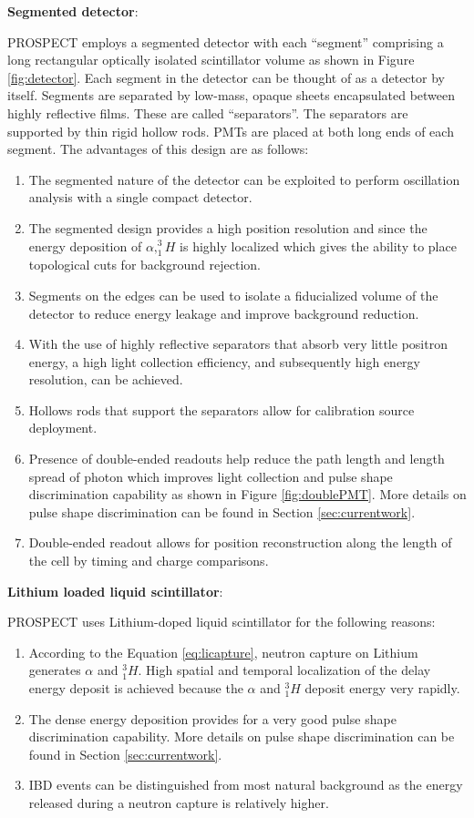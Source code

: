 \documentclass[11pt]{article}
\numberwithin{equation}{section}
\begin{document}
\noindent
\textbf{Segmented detector}:

\noindent
PROSPECT employs a segmented detector with each ``segment'' comprising a long rectangular optically isolated scintillator volume as shown in Figure \ref{fig:detector}. Each segment in the detector can be thought of as a detector by itself. Segments are separated by low-mass, opaque sheets encapsulated between highly reflective films. These are called ``separators''. The separators are supported by thin rigid hollow rods. PMTs are placed at both long ends of each segment. The advantages of this design are as follows:
\begin{enumerate}
\item The segmented nature of the detector can be exploited to perform oscillation analysis with a single compact detector. 
\item The segmented design provides a high position resolution and since the energy deposition of $\alpha , ^3_{1} H$ is highly localized which gives the ability to place topological cuts for background rejection.
\item Segments on the edges can be used to isolate a fiducialized volume of the detector to reduce energy leakage and improve background reduction. 
\item With the use of highly reflective separators that absorb very little positron energy, a high light collection efficiency, and subsequently high energy resolution, can be achieved.
\item Hollows rods that support the separators allow for calibration source deployment.
\item Presence of double-ended readouts help reduce the path length and length spread of photon which improves light collection and pulse shape discrimination capability as shown in Figure \ref{fig:doublePMT}. More details on pulse shape discrimination can be found in Section \ref{sec:currentwork}.
\item Double-ended readout allows for position reconstruction along the length of the cell by timing and charge comparisons.
\end{enumerate}

\noindent
\textbf{Lithium loaded liquid scintillator}:

\noindent
PROSPECT uses Lithium-doped liquid scintillator for the following reasons: 
\begin{enumerate}
\item According to the Equation \ref{eq:licapture}, neutron capture on Lithium generates $\alpha$ and $^{3}_1 H$. High spatial and temporal localization of the delay energy deposit is achieved because the $\alpha$ and $^{3}_1 H$ deposit energy very rapidly.
\item The dense energy deposition provides for a very good pulse shape discrimination capability. More details on pulse shape discrimination can be found in Section \ref{sec:currentwork}.
\item IBD events can be distinguished from most natural background as the energy released during a neutron capture is relatively higher.
\end{enumerate}
\end{document}
